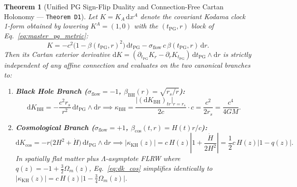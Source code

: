 \documentclass[11pt,a4paper]{article}
\newtheorem{theorem}{Theorem}[section]
\theoremstyle{remark}
\begin{document}
\begin{theorem}[Unified PG Sign-Flip Duality and Connection-Free Cartan Holonomy --- \texttt{Theorem D1}]
\label{thm:d1}
Let $K = K_A\,\mathrm{d}x^A$ denote the covariant Kodama clock 1-form obtained by lowering $K^A = (1, 0)$ with the $(t_{\mathrm{PG}}, r)$ block of Eq.~\eqref{eq:master_pg_metric}:
\begin{equation}
  K = -c^2\bigl(1 - \beta(t_{\mathrm{PG}}, r)^2\bigr)\,\mathrm{d}t_{\mathrm{PG}} - \sigma_{\mathrm{flow}}\,c\,\beta(t_{\mathrm{PG}}, r)\,\mathrm{d}r.
  \label{eq:kodama_1form}
\end{equation}
Then its Cartan exterior derivative $\mathrm{d}K = (\partial_{t_{\mathrm{PG}}} K_r - \partial_r K_{t_{\mathrm{PG}}})\,\mathrm{d}t_{\mathrm{PG}} \wedge \mathrm{d}r$ is strictly independent of any affine connection and evaluates on the two canonical branches to:
\begin{enumerate}
  \item \textbf{Black Hole Branch ($\sigma_{\mathrm{flow}} = -1$, $\beta_{\mathrm{BH}}(r) = \sqrt{r_s/r}$):}
  \begin{equation}
    \mathrm{d}K_{\mathrm{BH}} = -\frac{c^2 r_s}{r^2}\,\mathrm{d}t_{\mathrm{PG}} \wedge \mathrm{d}r \implies \kappa_{\mathrm{BH}} = \frac{\bigl|(\mathrm{d}K_{\mathrm{BH}})_{tr}\bigr|_{r=r_s}}{2c}\cdot c = \frac{c^2}{2r_s} = \frac{c^4}{4GM}.
    \label{eq:dk_bh}
  \end{equation}
  \item \textbf{Cosmological Branch ($\sigma_{\mathrm{flow}} = +1$, $\beta_{\mathrm{cos}}(t, r) = H(t)r/c$):}
  \begin{equation}
    \mathrm{d}K_{\mathrm{cos}} = -r\bigl(2H^2 + \dot{H}\bigr)\,\mathrm{d}t_{\mathrm{PG}} \wedge \mathrm{d}r \implies \bigl|\kappa_{\mathrm{KH}}(z)\bigr| = c\,H(z)\left|1 + \frac{\dot{H}}{2H^2}\right| = \frac{1}{2}c\,H(z)\bigl|1 - q(z)\bigr|.
    \label{eq:dk_cos}
  \end{equation}
  In spatially flat matter plus $\Lambda$-asymptote FLRW where $q(z) = -1 + \frac{3}{2}\Omega_m(z)$, Eq.~\eqref{eq:dk_cos} simplifies identically to $|\kappa_{\mathrm{KH}}(z)| = c\,H(z)\bigl|1 - \frac{3}{4}\Omega_m(z)\bigr|$.
\end{enumerate}
\end{theorem}
\end{document}
